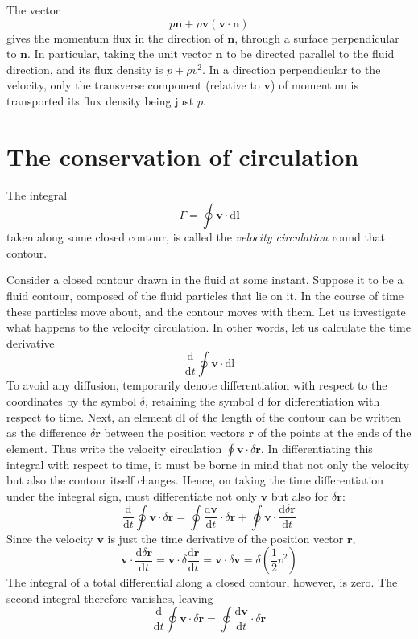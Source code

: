 \documentclass[conference]{IEEEtran}
\theoremstyle{definition}
\theoremstyle{remark}
\begin{document}
    The vector
    \begin{equation}
        p \mathbf{n} + \rho \mathbf{v} (\mathbf{v} \cdot \mathbf{n})
    \end{equation}
    gives the momentum flux in the direction of $\mathbf{n}$, through a surface perpendicular to $\mathbf{n}$. In particular, taking the unit vector $\mathbf{n}$ to be directed parallel to the fluid direction, and its flux density is $p + \rho v^2$. In a direction perpendicular to the velocity, only the transverse component (relative to $\mathbf{v}$) of momentum is transported its flux density being just $p$.

    \section{The conservation of circulation}
    The integral
    \[
        \Gamma = \oint \mathbf{v} \cdot \mathrm{d} \mathbf{l}
    \]
    taken along some closed contour, is called the \emph{velocity circulation} round that contour.

    Consider a closed contour drawn in the fluid at some instant. Suppose it to be a fluid contour, composed of the fluid particles that lie on it. In the course of time these particles move about, and the contour moves with them. Let us investigate what happens to the velocity circulation. In other words, let us calculate the time derivative
    \[
        \dfrac{\mathrm{d}}{\mathrm{d} t} \oint \mathbf{v} \cdot \mathrm{d} \mathrm{l}
    \]
    To avoid any diffusion, temporarily denote differentiation with respect to the coordinates by the symbol $\delta$, retaining the symbol $\mathrm{d}$ for differentiation with respect to time. Next, an element $\mathrm{d} \mathbf{l}$ of the length of the contour can be written as the difference $\delta \mathbf{r}$ between the position vectors $\mathbf{r}$ of the points at the ends of the element. Thus write the velocity circulation $\oint \mathbf{v} \cdot \delta \mathbf{r}$. In differentiating this integral with respect to time, it must be borne in mind that not only the velocity but also the contour itself changes. Hence, on taking the time differentiation under the integral sign, must differentiate not only $\mathbf{v}$ but also for $\delta \mathbf{r}$:
    \[
        \dfrac{\mathrm{d}}{\mathrm{d} t} \oint \mathbf{v} \cdot \delta \mathbf{r} = \oint \dfrac{\mathrm{d} \mathbf{v}}{\mathrm{d} t} \cdot \delta \mathbf{r} + \oint \mathbf{v} \cdot \dfrac{\mathrm{d} \delta \mathbf{r}}{\mathrm{d} t}
    \]
    Since the velocity $\mathbf{v}$ is just the time derivative of the position vector $\mathbf{r}$,
    \[
        \mathbf{v} \cdot \dfrac{\mathrm{d} \delta \mathbf{r}}{\mathrm{d} t} = \mathbf{v} \cdot \delta \dfrac{\mathrm{d} \mathbf{r}}{\mathrm{d} t} = \mathbf{v} \cdot \delta \mathbf{v} = \delta \left( \dfrac12 v^2 \right)
    \]
    The integral of a total differential along a closed contour, however, is zero. The second integral therefore vanishes, leaving
    \[
        \dfrac{\mathrm{d}}{\mathrm{d} t} \oint \mathbf{v} \cdot \delta \mathbf{r} = \oint \dfrac{\mathrm{d} \mathbf{v}}{\mathrm{d} t} \cdot \delta \mathbf{r}
    \]
\end{document}
